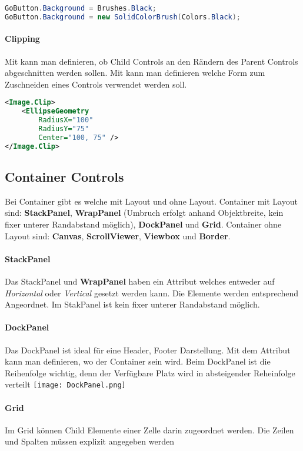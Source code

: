 \begin{lstlisting}[language=java]
GoButton.Background = Brushes.Black;
GoButton.Background = new SolidColorBrush(Colors.Black);
\end{lstlisting}

\paragraph{Clipping} Mit  kann man definieren, ob Child Controls an den Rändern des Parent Controls abgeschnitten werden sollen. Mit  kann man definieren welche Form zum Zuschneiden eines Controls verwendet werden soll.
\begin{lstlisting}[language=xml]
<Image.Clip>
    <EllipseGeometry
        RadiusX="100"
        RadiusY="75"
        Center="100, 75" />
</Image.Clip>
\end{lstlisting}
\subsection{Container Controls} Bei Container gibt es welche mit Layout und ohne Layout. Container mit Layout sind: \textbf{StackPanel}, \textbf{WrapPanel} (Umbruch erfolgt anhand Objektbreite, kein fixer unterer Randabstand möglich), \textbf{DockPanel} und \textbf{Grid}. Container ohne Layout sind: \textbf{Canvas}, \textbf{ScrollViewer}, \textbf{Viewbox} und \textbf{Border}.
\paragraph{StackPanel}Das StackPanel und \textbf{WrapPanel} haben ein Attribut  welches entweder auf \textit{Horizontal} oder \textit{Vertical} gesetzt werden kann. Die Elemente werden entsprechend Angeordnet. Im StakPanel ist kein fixer unterer Randabstand möglich.
\paragraph{DockPanel}Das DockPanel ist ideal für eine Header, Footer Darstellung.
Mit dem Attribut  kann man definieren, wo der Container sein wird. Beim DockPanel ist die Reihenfolge wichtig, denn der Verfügbare Platz wird in absteigender Reheinfolge verteilt
\texttt{[image: DockPanel.png]}
\paragraph{Grid} Im Grid können Child Elemente einer Zelle darin zugeordnet werden. Die Zeilen und Spalten müssen explizit angegeben werden

